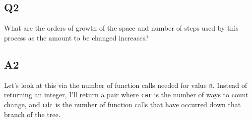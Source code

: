 \documentclass[
]{article}
\begin{document}
\hypertarget{q2}{%
\subsection{Q2}\label{q2}}

What are the orders of growth of the space and number of steps used by
this process as the amount to be changed increases?

\hypertarget{a2-1}{%
\subsection{A2}\label{a2-1}}

Let's look at this via the number of function calls needed for value
\texttt{n}. Instead of returning an integer, I'll return a pair where
\texttt{car} is the number of ways to count change, and \texttt{cdr} is
the number of function calls that have occurred down that branch of the
tree.
\end{document}
